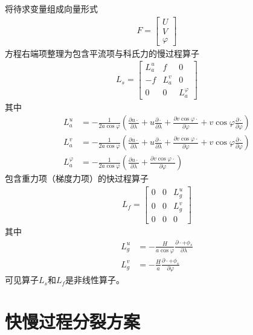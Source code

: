 \documentclass{ctexart}
\begin{document}
将待求变量组成向量形式
\begin{align}
  F = \left[
    \begin{array}{c}
      U \\
      V \\
      \varphi
    \end{array}
  \right]
\end{align}
方程右端项整理为包含平流项与科氏力的慢过程算子
\begin{align}
  L_s = \left[
    \begin{array}{ccc}
      L_a^u & f & 0 \\
      - f & L_a^v & 0 \\
      0 & 0 & L_a^\varphi
    \end{array}
  \right]
\end{align}
其中
\begin{align}
  L_a^u & = - \frac{1}{2 a \cos{\varphi}} \left( \frac{\partial u \cdot}{\partial \lambda} + u \frac{\partial \cdot}{\partial \lambda} + \frac{\partial v \cos{\varphi} \cdot}{\partial \varphi} + v \cos{\varphi} \frac{\partial \cdot}{\partial \varphi}  \right) \\
  L_a^v & = - \frac{1}{2 a \cos{\varphi}} \left( \frac{\partial u \cdot}{\partial \lambda} + u \frac{\partial \cdot}{\partial \lambda} + \frac{\partial v \cos{\varphi} \cdot}{\partial \varphi} + v \cos{\varphi} \frac{\partial \cdot}{\partial \varphi} \right) \\
  L_a^\varphi & = - \frac{1}{2 a \cos{\varphi}} \left( \frac{\partial u \cdot}{\partial \lambda} + \frac{\partial v \cos{\varphi} \cdot}{\partial \varphi} \right)
\end{align}
包含重力项（梯度力项）的快过程算子
\begin{align}
  L_f = \left[
    \begin{array}{ccc}
      0 & 0 & L_g^u \\
      0 & 0 & L_g^v \\
      0 & 0 & 0
    \end{array}
  \right]
\end{align}
其中
\begin{align}
  L_g^u & = - \frac{H}{a \cos{\varphi}} \frac{\partial \cdot + \phi_s}{\partial \lambda} \\
  L_g^v & = - \frac{H}{a} \frac{\partial \cdot + \phi_s}{\partial \varphi}
\end{align}
可见算子$L_s$和$L_f$是非线性算子。

\section{快慢过程分裂方案}
\end{document}
